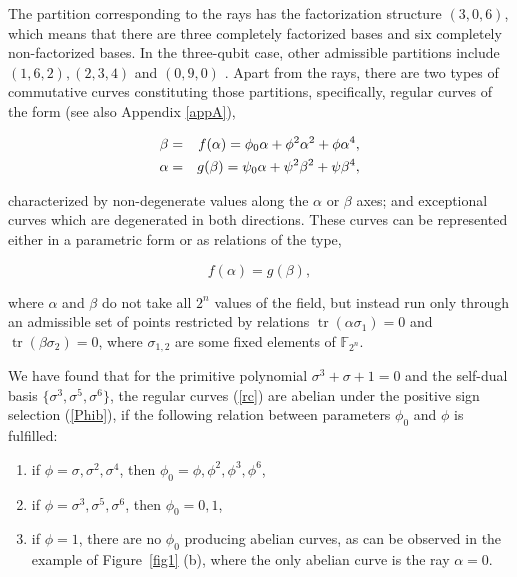 \documentclass[quantumrep,article,submit,pdftex,moreauthors]{Definitions/mdpi}
\DeclareMathOperator{\tr}{tr}
\begin{document}
The partition corresponding to the rays has the factorization structure
$(3,0,6)$, which means that there are three completely factorized bases and six
completely non-factorized bases. In the three-qubit case, other admissible
partitions include $(1,6,2),(2,3,4)$ and $(0,9,0)$ \cite{factor1,factor2}.
Apart from the rays, there are two types of commutative curves constituting
those partitions, specifically, regular curves of the form \cite{GS2} (see also
Appendix \ref{appA}),

\begin{eqnarray}
  \beta
  &=& f(\alpha) = \phi_{0}\alpha +\phi^{2} \alpha^{2} + \phi \alpha^{4},
  \label{rc} \\
  \alpha
  &=& g(\beta) = \psi_{0}\alpha +\psi^{2} \beta^{2} + \psi \beta^{4},
  \notag
\end{eqnarray}

characterized by non-degenerate values along the $\alpha$ or $\beta$ axes; and
exceptional curves which are degenerated in both directions. These curves can be
represented either in a parametric form or as relations of the type,

\begin{equation*}
  f(\alpha) = g(\beta),
\end{equation*}

where $\alpha$ and $\beta$ do not take all $2^{n}$ values of the field, but
instead run only through an admissible set of points restricted by relations
$\tr(\alpha\sigma_{1}) = 0$ and $\tr(\beta\sigma_{2}) = 0$, where
$\sigma_{1,2}$ are some fixed elements of $\mathbb{F}_{2^{n}}$.

We have found that for the primitive polynomial $\sigma^{3} + \sigma + 1 = 0$
and the self-dual basis $\{\sigma^{3},\sigma^{5},\sigma^{6}\}$, the regular
curves (\ref{rc}) are abelian under the positive sign selection (\ref{Phib}), if
the following relation between parameters $\phi_{0}$ and $\phi$ is fulfilled:

\begin{enumerate}
  \item if $\phi =\sigma, \sigma^{2}, \sigma^{4}$, then $\phi_{0} =
    \phi,\phi^{2},\phi^{3}, \phi^{6}$,

  \item if $\phi = \sigma^{3}, \sigma^{5}, \sigma^{6}$, then $\phi_{0}=0,1$,

  \item if $\phi = 1$, there are no $\phi_{0}$ producing abelian curves, as can
    be observed in the example of Figure~\ref{fig1} (b), where the only abelian
    curve is the ray $\alpha = 0$.
\end{enumerate}
\end{document}
